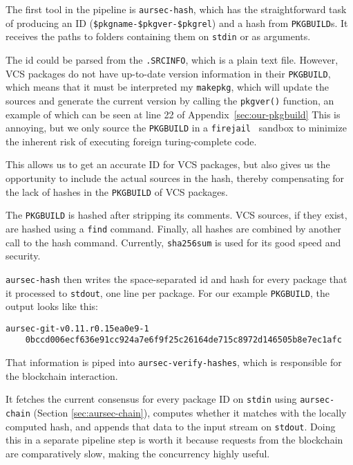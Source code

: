 The first tool in the pipeline is \texttt{aursec-hash}, which has the straightforward task of producing an ID (\texttt{\$pkgname-\$pkgver-\$pkgrel}) and a hash from \texttt{PKGBUILD}s.
It receives the paths to folders containing them on \texttt{stdin} or as arguments.

The id could be parsed from the \texttt{.SRCINFO}, which is a plain text file.
However, VCS packages do not have up-to-date version information in their \texttt{PKGBUILD}, which means that it must be interpreted my \texttt{makepkg}, which will update the sources and generate the current version by calling the \texttt{pkgver()} function, an example of which can be seen at line 22 of Appendix~\ref{sec:our-pkgbuild}
This is annoying, but we only source the \texttt{PKGBUILD} in a \texttt{firejail}~\cite{wiki:firejail} sandbox to minimize the inherent risk of executing foreign turing-complete code.

This allows us to get an accurate ID for VCS packages, but also gives us the opportunity to include the actual sources in the hash, thereby compensating for the lack of hashes in the \texttt{PKGBUILD} of VCS packages.

The \texttt{PKGBUILD} is hashed after stripping its comments. VCS sources, if they exist, are hashed using a \texttt{find} command.
Finally, all hashes are combined by another call to the hash command.
Currently, \texttt{sha256sum} is used for its good speed and security.

\texttt{aursec-hash} then writes the space-separated id and hash for every package that it processed to \texttt{stdout}, one line per package.
For our example \texttt{PKGBUILD}, the output looks like this:

\begin{verbatim}
aursec-git-v0.11.r0.15ea0e9-1
    0bccd006ecf636e91cc924a7e6f9f25c26164de715c8972d146505b8e7ec1afc
\end{verbatim}

That information is piped into \texttt{aursec-verify-hashes}, which is responsible for the blockchain interaction.

It fetches the current consensus for every package ID on \texttt{stdin} using \texttt{aursec-chain} (Section \ref{sec:aursec-chain}), computes whether it matches with the locally computed hash, and appends that data to the input stream on \texttt{stdout}. Doing this in a separate pipeline step is worth it because requests from the blockchain are comparatively slow, making the concurrency highly useful.


